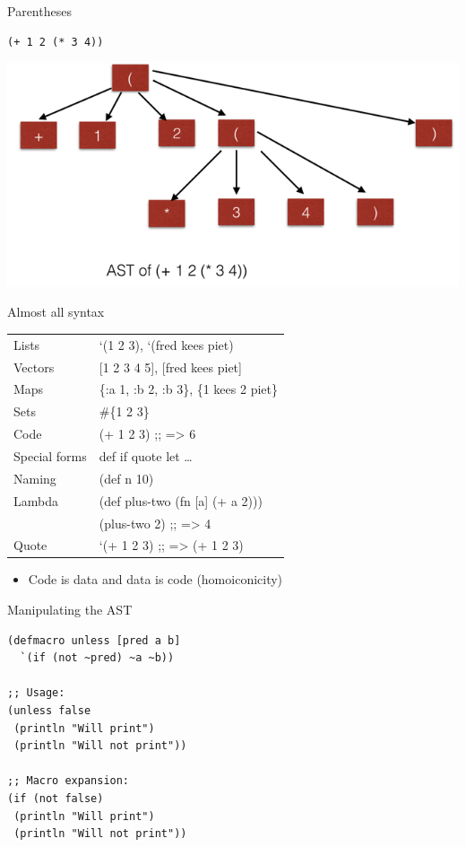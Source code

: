 \documentclass[presentation]{beamer}
\begin{document}
\begin{frame}[fragile,label={sec:orgheadline4}]{Parentheses}
 \begin{verbatim}
(+ 1 2 (* 3 4))
\end{verbatim}
\includegraphics[width=.9\linewidth]{../images/ast.png}
\end{frame}

\begin{frame}[label={sec:orgheadline5}]{Almost all syntax}
\begin{center}
\begin{tabular}{ll}
Lists & \alert{`(1 2 3)}, \alert{`(fred kees piet)}\\
Vectors & \alert{[1 2 3 4 5]}, \alert{[fred kees piet]}\\
Maps & \alert{\{:a 1, :b 2, :b 3\}}, \alert{\{1 kees 2 piet\}}\\
Sets & \alert{\#\{1 2 3\}}\\
Code & \alert{(+ 1 2 3)}  \alert{;; => 6}\\
Special forms & \alert{def} \alert{if} \alert{quote} \alert{let} \ldots{}\\
Naming & \alert{(def n 10)}\\
Lambda & \alert{(def plus-two (fn [a] (+ a 2)))}\\
 & \alert{(plus-two 2)} \alert{;; => 4}\\
Quote & \alert{`(+ 1 2 3)} \alert{;; => (+ 1 2 3)}\\
\end{tabular}
\end{center}
\begin{itemize}
\item Code is data and data is code (homoiconicity)
\end{itemize}
\end{frame}

\begin{frame}[fragile,label={sec:orgheadline6}]{Manipulating the AST}
 \begin{verbatim}
(defmacro unless [pred a b]
  `(if (not ~pred) ~a ~b))

;; Usage:
(unless false
 (println "Will print")
 (println "Will not print"))

;; Macro expansion:
(if (not false)
 (println "Will print")
 (println "Will not print"))
\end{verbatim}
\end{frame}
\end{document}
